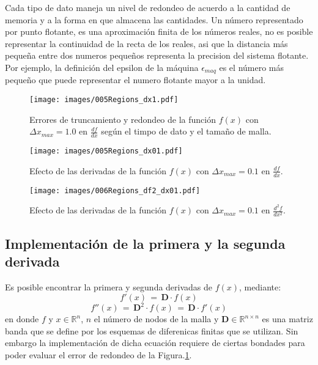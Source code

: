 \documentclass[9pt,technote,twoside,letterpaper,onecolumn]{IEEEtran}
\begin{document}
\begin{multicols}{2}
Cada tipo de dato maneja un nivel de redondeo de acuerdo a la cantidad de memoria y a la forma en que almacena las cantidades. Un número representado por punto flotante, es una aproximación finita de los números reales, no es posible representar la continuidad de la recta de los reales, asi que la distancia más pequeña entre dos numeros pequeños representa la precision del sistema flotante. Por ejemplo, la definición del epsilon de la máquina $\epsilon_{maq}$ es el número más pequeño que puede representar el numero flotante mayor a la unidad.

\begin{figure}[H]
  \centering
  \texttt{[image: images/005Regions\_dx1.pdf]}
  \caption{Errores de truncamiento y redondeo de la función $f(x)$ con $\Delta x_{max}=1.0$ en $\frac{df}{dx}$ según el timpo de dato y el tamaño de malla.}
  \label{fig:regions_dx10}
\end{figure}

\begin{figure}[H]
  \centering
  \texttt{[image: images/005Regions\_dx01.pdf]}
  \caption{Efecto de las derivadas de la función $f(x)$ con $\Delta x_{max}=0.1$ en $\frac{df}{dx}$.}
  \label{fig:regions_dx01}
\end{figure}

\begin{figure}[H]
  \centering
  \texttt{[image: images/006Regions\_df2\_dx01.pdf]}
  \caption{Efecto de las derivadas de la función $f(x)$ con $\Delta x_{max}=0.1$ en $\frac{d^2f}{dx^2}$.}
  \label{fig:regions_d2fdx01}
\end{figure}

\subsection{Implementación de la primera y la segunda derivada}
\label{sec:imp1rader}
Es posible encontrar la primera y segunda derivadas de $f(x)$, mediante:
\begin{equation}
  f'(x)\,=\,\mathbf{D}\cdot f(x)
  \label{eq:matdiff}  
\end{equation}
\begin{equation}
  f''(x)\,=\,\mathbf{D}^2\cdot f(x)\,=\,\mathbf{D}\cdot f'(x)
  \label{eq:matdiff2}  
\end{equation}
en donde $f$ y $x\in\mathbb{R}^{n}$, $n$ el número de nodos de la malla y $\mathbf{D}\in\mathbb{R}^{n\times n}$ es una matriz banda que se define por los esquemas de diferenicas finitas que se utilizan. Sin embargo la implementación de dicha ecuación requiere de ciertas bondades para poder evaluar el error de redondeo de la Figura.\ref{fig:regions_dx10}.  

\end{multicols}
\end{document}
